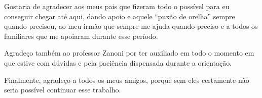 Gostaria de agradecer aos meus pais que fizeram todo o possível para
eu conseguir chegar até aqui, dando apoio e aquele ``puxão de orelha''
sempre quando precisou, ao meu irmão que sempre me ajuda quando
preciso e a todos os familiares que me apoiaram durante esse período.

Agradeço também ao professor Zanoni por ter auxiliado em todo o
momento em que estive com dúvidas e pela paciência dispensada durante
a orientação.

Finalmente, agradeço a todos os meus amigos, porque sem eles
certamente não seria possível continuar esse trabalho.
